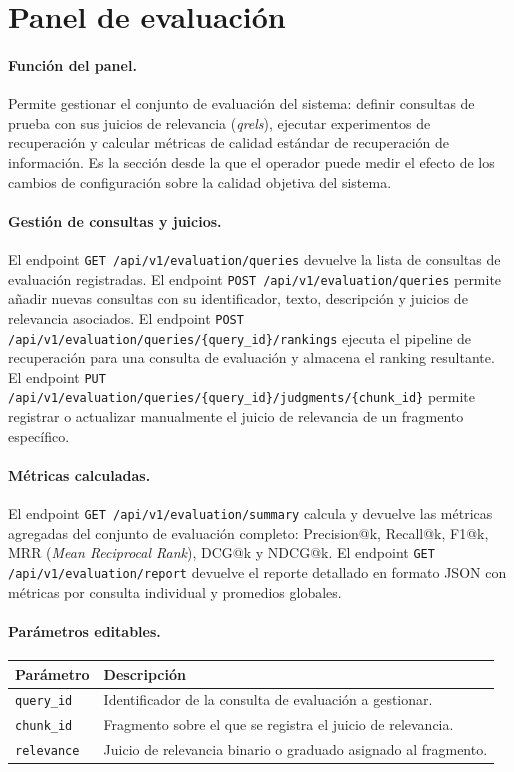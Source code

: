 \documentclass[11pt]{article}
\begin{document}
\section{Panel de evaluación}

\paragraph{Función del panel.}
Permite gestionar el conjunto de evaluación del sistema: definir consultas de prueba con sus
juicios de relevancia (\emph{qrels}), ejecutar experimentos de recuperación y calcular métricas
de calidad estándar de recuperación de información. Es la sección desde la que el operador
puede medir el efecto de los cambios de configuración sobre la calidad objetiva del sistema.

\paragraph{Gestión de consultas y juicios.}
El endpoint \texttt{GET /api/v1/evaluation/queries} devuelve la lista de consultas de
evaluación registradas. El endpoint \texttt{POST /api/v1/evaluation/queries} permite añadir
nuevas consultas con su identificador, texto, descripción y juicios de relevancia asociados.
El endpoint \texttt{POST /api/v1/evaluation/queries/\{query\_id\}/rankings} ejecuta el
pipeline de recuperación para una consulta de evaluación y almacena el ranking resultante.
El endpoint \texttt{PUT /api/v1/evaluation/queries/\{query\_id\}/judgments/\{chunk\_id\}}
permite registrar o actualizar manualmente el juicio de relevancia de un fragmento específico.

\paragraph{Métricas calculadas.}
El endpoint \texttt{GET /api/v1/evaluation/summary} calcula y devuelve las métricas agregadas
del conjunto de evaluación completo: Precision@k, Recall@k, F1@k, MRR (\emph{Mean Reciprocal
Rank}), DCG@k y NDCG@k. El endpoint \texttt{GET /api/v1/evaluation/report} devuelve el reporte
detallado en formato JSON con métricas por consulta individual y promedios globales.

\paragraph{Parámetros editables.}

\begin{center}
\begin{tabular}{lp{9cm}}
\toprule
\textbf{Parámetro} & \textbf{Descripción} \\
\midrule
\texttt{query\_id} & Identificador de la consulta de evaluación a gestionar. \\
\texttt{chunk\_id} & Fragmento sobre el que se registra el juicio de relevancia. \\
\texttt{relevance} & Juicio de relevancia binario o graduado asignado al fragmento. \\
\bottomrule
\end{tabular}
\end{center}
\end{document}
